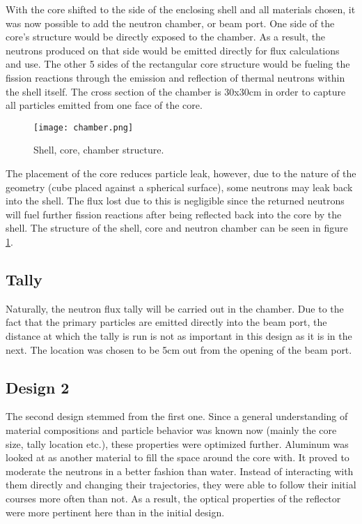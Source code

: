 With the core shifted to the side of the enclosing shell and all materials chosen, it was now possible to add the neutron chamber, or beam port. One side of the core's structure would be directly exposed to the chamber. As a result, the neutrons produced on that side would be emitted directly for flux calculations and use. The other 5 sides of the rectangular core structure would be fueling the fission reactions through the emission and reflection of thermal neutrons within the shell itself. The cross section of the chamber is 30x30cm in order to capture all particles emitted from one face of the core.

\begin{figure}[!htbp]
\caption{Shell, core, chamber structure.}
\label{fig:chamber}
\centering
\texttt{[image: chamber.png]}
\end{figure}

The placement of the core reduces particle leak, however, due to the nature of the geometry (cube placed against a spherical surface), some neutrons may leak back into the shell. The flux lost due to this is negligible since the returned neutrons will fuel further fission reactions after being reflected back into the core by the shell. The structure of the shell, core and neutron chamber can be seen in figure \ref{fig:chamber}. 

\subsection{Tally}

Naturally, the neutron flux tally will be carried out in the chamber. Due to the fact that the primary particles are emitted directly into the beam port, the distance at which the tally is run is not as important in this design as it is in the next. The location was chosen to be 5cm out from the opening of the beam port.

\subsection{Design 2}

The second design stemmed from the first one. Since a general understanding of material compositions and particle behavior was known now (mainly the core size, tally location etc.), these properties were optimized further. Aluminum was looked at as another material to fill the space around the core with. It proved to moderate the neutrons in a better fashion than water. Instead of interacting with them directly and changing their trajectories, they were able to follow their initial courses more often than not. As a result, the optical properties of the reflector were more pertinent here than in the initial design.

